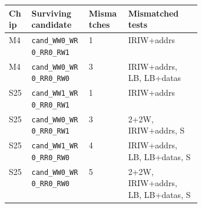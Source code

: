 \begin{tabular}{lllp{0.38\linewidth}}
\toprule
Chip & Surviving candidate & Mismatches & Mismatched tests \\
\midrule
M4 & \texttt{cand\_WW0\_WR0\_RR0\_RW1} & 1 & IRIW+addrs \\
M4 & \texttt{cand\_WW0\_WR0\_RR0\_RW0} & 3 & IRIW+addrs, LB, LB+datas \\
\midrule
S25 & \texttt{cand\_WW1\_WR0\_RR0\_RW1} & 1 & IRIW+addrs \\
S25 & \texttt{cand\_WW0\_WR0\_RR0\_RW1} & 3 & 2+2W, IRIW+addrs, S \\
S25 & \texttt{cand\_WW1\_WR0\_RR0\_RW0} & 4 & IRIW+addrs, LB, LB+datas, S \\
S25 & \texttt{cand\_WW0\_WR0\_RR0\_RW0} & 5 & 2+2W, IRIW+addrs, LB, LB+datas, S \\
\bottomrule
\end{tabular}
